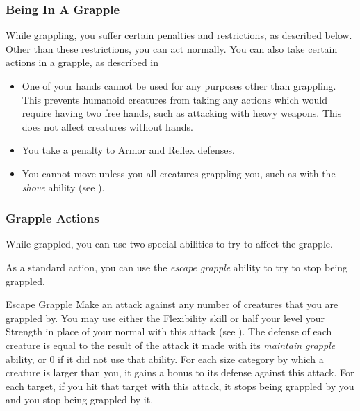         \subsubsection{Being In A Grapple}
            While grappling, you suffer certain penalties and restrictions, as described below. Other than these restrictions, you can act normally. You can also take certain actions in a grapple, as described in 
            \begin{itemize}
                \item One of your hands cannot be used for any purposes other than grappling.
                    This prevents humanoid creatures from taking any actions which would require having two free hands, such as attacking with heavy weapons.
                    This does not affect creatures without hands.
                \item You take a  penalty to Armor and Reflex defenses.
                \item You cannot move unless you  all creatures grappling you, such as with the \textit{shove} ability (see ).
            \end{itemize}

        \subsubsection{Grapple Actions}\label{Grapple Actions}
            While grappled, you can use two special abilities to try to affect the grapple.

            \label{Escape Grapple} As a standard action, you can use the \textit{escape grapple} ability to try to stop being grappled.

            \begin{activeability}{Escape Grapple}
                \rankline
                Make an attack against any number of creatures that you are grappled by.
                You may use either the Flexibility skill or half your level \add your Strength in place of your normal  with this attack (see ).
                The defense of each creature is equal to the result of the attack it made with its \textit{maintain grapple} ability, or 0 if it did not use that ability.
                For each size category by which a creature is larger than you, it gains a  bonus to its defense against this attack.
                For each target, if you hit that target with this attack, it stops being grappled by you and you stop being grappled by it.
            \end{activeability}


